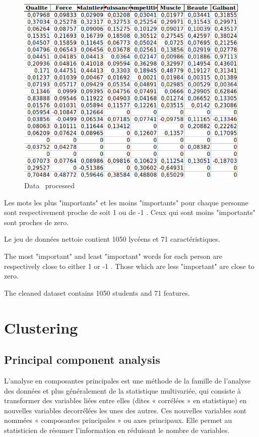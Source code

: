 \documentclass[12pt]{article}
\begin{document}
\begin{figure}[h]
\begin{center}
\includegraphics[scale=0.7]{donnée_nettoyé.png} 
\caption[]{Data \ processed }
\end{center}
\end{figure}



Les mots les plus "importants"  et les moins "importants" pour chaque personne sont respectivement proche de soit 1 ou de -1 . Ceux qui  sont  moins "importants" sont proches de zero.

Le jeu de données nettoie contient 1050
lycéens et 71 caractéristiques.

The most "important" and least "important" words for each person are respectively close to either 1 or -1 . Those which are less "important" are close to zero.

The cleaned dataset contains 1050
students and 71 features.


\section{Clustering} 


\subsection{Principal component analysis}

L'analyse en composantes principales est une méthode de la famille de l'analyse des données et plus généralement de la
statistique multivariée, qui consiste à transformer des variables liées entre elles (dites « corrélées » en statistique) en nouvelles variables decorrélées les unes des autres. Ces nouvelles variables sont nommées « composantes principales » ou axes principaux. Elle permet au statisticien de résumer l'information en réduisant le nombre de variables.
\end{document}
